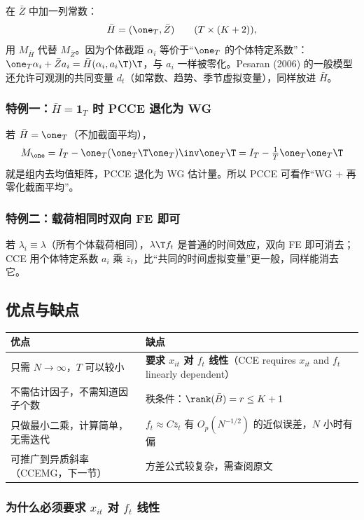 在 $\bar Z$ 中加一列常数：
\[
\bar H=(\one_T,\bar Z)\qquad(T\times(K+2)),
\]
用 $M_{\bar H}$ 代替 $M_{\bar Z}$。因为个体截距 $\alpha_i$ 等价于“$\one_T$ 的个体特定系数”：$\one_T\alpha_i+\bar Za_i=\bar H(\alpha_i,a_i\T)\T$，与 $a_i$ 一样被零化。Pesaran (2006) 的一般模型还允许可观测的共同变量 $d_t$（如常数、趋势、季节虚拟变量），同样放进 $\bar H$。

\subsubsection{特例一：\texorpdfstring{$\bar H=\mathbf{1}_T$}{H = 1\_T} 时 PCCE 退化为 WG}

若 $\bar H=\one_T$（不加截面平均），
\[
M_{\one}=I_T-\one_T(\one_T\T\one_T)\inv\one_T\T=I_T-\tfrac1T\one_T\one_T\T
\]
就是组内去均值矩阵，PCCE 退化为 WG 估计量。所以 PCCE 可看作“WG + 再零化截面平均”。

\subsubsection{特例二：载荷相同时双向 FE 即可}

若 $\lambda_i\equiv\lambda$（所有个体载荷相同），$\lambda\T f_t$ 是普通的时间效应，双向 FE 即可消去；CCE 用个体特定系数 $a_i$ 乘 $\bar z_t$，比“共同的时间虚拟变量”更一般，同样能消去它。

\subsection{优点与缺点}

\begin{center}
\small
\begin{tabularx}{\linewidth}{LL}
\toprule
优点 & 缺点\\
\midrule
只需 $N\to\infty$，$T$ 可以较小 & \textbf{要求 $x_{it}$ 对 $f_t$ 线性}（CCE requires $x_{it}$ and $f_t$ linearly dependent）\\
不需估计因子，不需知道因子个数 & 秩条件：$\rank(\bar B)=r\le K+1$\\
只做最小二乘，计算简单，无需迭代 & $f_t\approx C\bar z_t$ 有 $O_p(N^{-1/2})$ 的近似误差，$N$ 小时有偏\\
可推广到异质斜率（CCEMG，下一节） & 方差公式较复杂，需查阅原文\\
\bottomrule
\end{tabularx}
\end{center}

\subsubsection{为什么必须要求 \texorpdfstring{$x_{it}$}{x\_it} 对 \texorpdfstring{$f_t$}{f\_t} 线性}


